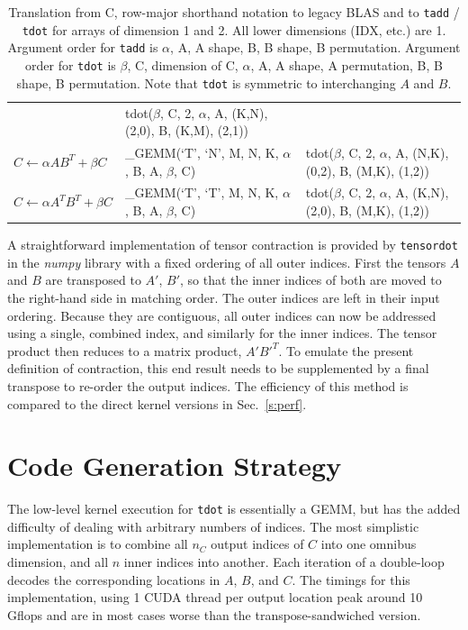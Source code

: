 \documentclass{sigplanconf}
\begin{document}
\begin{table}
\begin{tabular}{lll}
    & tdot($\beta$, C, 2, $\alpha$, A, (K,N), (2,0), B, (K,M), (2,1)) \\
$C \gets \alpha A B^T + \beta C$ & \_GEMM(`T', `N', M, N, K, $\alpha$, B, A, $\beta$, C) %
    & tdot($\beta$, C, 2, $\alpha$, A, (N,K), (0,2), B, (M,K), (1,2)) \\
$C \gets \alpha A^T B^T + \beta C$ & \_GEMM(`T', `T', M, N, K, $\alpha$, B, A, $\beta$, C) %
    & tdot($\beta$, C, 2, $\alpha$, A, (K,N), (2,0), B, (M,K), (1,2)) \\
\end{tabular}
\caption{Translation from C, row-major shorthand notation to legacy BLAS and
to {\tt tadd} / {\tt tdot} for arrays of dimension 1 and 2.  All lower dimensions (IDX, etc.) are 1.
Argument order for {\tt tadd} is $\alpha$, A, A shape, B, B shape, B permutation.
Argument order for {\tt tdot} is  $\beta$, C, dimension of C, $\alpha$, A, A shape, A permutation, B, B shape, B permutation.  Note that {\tt tdot} is symmetric to interchanging $A$ and $B$.}\label{t:blas}
\end{table}

  A straightforward implementation of tensor contraction is provided
by {\tt tensordot} in the {\em numpy} library
with a fixed ordering of all outer indices.\cite{numpy}
First the tensors $A$ and $B$ are transposed to $A'$, $B'$,
so that the inner indices of both are moved to the right-hand side in matching order.
The outer indices are left in their input ordering.  Because they are contiguous, all outer indices
can now be addressed using a single, combined index, and similarly for the inner indices.
The tensor product then reduces to a matrix product, $A' B'^T$.
To emulate the present definition of contraction, this end result needs to be supplemented
by a final transpose to re-order the output indices.  The efficiency of this method is compared to the
direct kernel versions in Sec.~\ref{s:perf}.

\section{ Code Generation Strategy}\label{s:gen}

  The low-level kernel execution for {\tt tdot} is essentially a GEMM, but
has the added difficulty of dealing with arbitrary numbers of indices.
The most simplistic implementation is to combine all $n_C$ output indices
of $C$ into one omnibus dimension, and all $n$ inner indices
into another.  Each iteration of a double-loop decodes the corresponding
locations in $A$, $B$, and $C$.  The timings for this implementation, using
1 CUDA thread per output location peak around 10 Gflops and are in most cases
worse than the transpose-sandwiched version.
\end{document}
